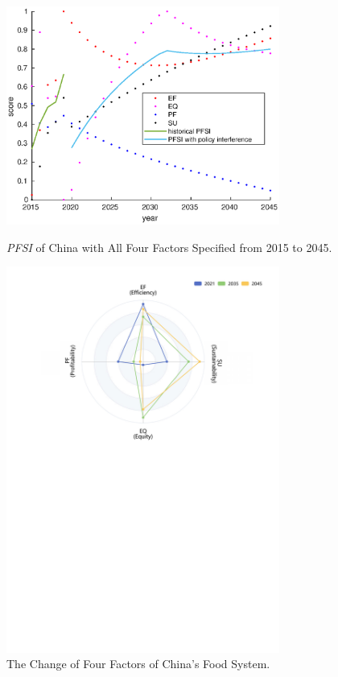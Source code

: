 \documentclass[12pt]{article}
\begin{document}
\begin{figure}[!htb]
    \centering
    \begin{minipage}[t]{0.48\textwidth}
        \centering
        \includegraphics[width = 0.8\textwidth]{figure/model/China/China_score.eps}
        \caption{\textit{PFSI} of China with All Four Factors Specified from 2015 to 2045.\label{fig:China_score}}
    \end{minipage}
    \begin{minipage}[t]{0.48\textwidth}
        \centering
        \includegraphics[width = 0.8\textwidth]{figure/radar/China_radar.pdf}
        \caption{The Change of Four Factors of China's Food System.\label{fig:China_radar}}
    \end{minipage}
\end{figure}
\end{document}
